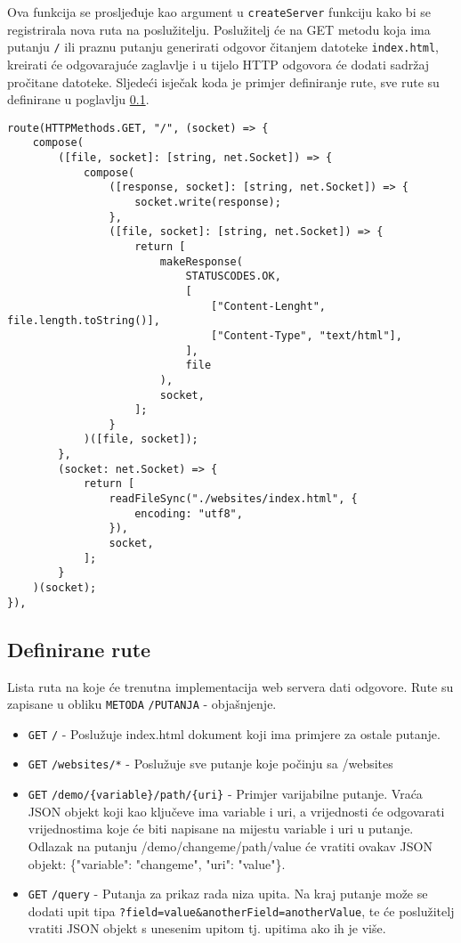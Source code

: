 \documentclass[]{foi} %
\begin{document}
Ova funkcija se prosljeđuje kao argument u \texttt{createServer} funkciju kako bi se
registrirala nova ruta na poslužitelju. Poslužitelj će na GET metodu koja ima putanju
\texttt{/} ili praznu putanju generirati odgovor čitanjem datoteke \texttt{index.html},
kreirati će odgovarajuće zaglavlje i u tijelo HTTP odgovora će dodati sadržaj pročitane
datoteke. Sljedeći isječak koda je primjer definiranje rute, sve rute su definirane u
poglavlju \ref{sec:rute}.
\begin{lstlisting}[caption={Primjer rute}, label=lst:primjer_rute]
route(HTTPMethods.GET, "/", (socket) => {
    compose(
        ([file, socket]: [string, net.Socket]) => {
            compose(
                ([response, socket]: [string, net.Socket]) => {
                    socket.write(response);
                },
                ([file, socket]: [string, net.Socket]) => {
                    return [
                        makeResponse(
                            STATUSCODES.OK,
                            [
                                ["Content-Lenght", file.length.toString()],
                                ["Content-Type", "text/html"],
                            ],
                            file
                        ),
                        socket,
                    ];
                }
            )([file, socket]);
        },
        (socket: net.Socket) => {
            return [
                readFileSync("./websites/index.html", {
                    encoding: "utf8",
                }),
                socket,
            ];
        }
    )(socket);
}),
\end{lstlisting}

\subsection{Definirane rute} \label{sec:rute}

Lista ruta na koje će trenutna implementacija web servera dati odgovore.
Rute su zapisane u obliku \texttt{METODA} \texttt{/PUTANJA} - objašnjenje.
\begin{itemize}
	\item \texttt{GET} \texttt{/} - Poslužuje index.html dokument koji ima primjere
	      za ostale putanje.
	\item \texttt{GET} \texttt{/websites/*} - Poslužuje sve putanje koje počinju sa /websites
	\item \texttt{GET} \texttt{/demo/\{variable\}/path/\{uri\}} - Primjer varijabilne putanje.
	      Vraća JSON objekt koji kao ključeve ima variable i uri, a vrijednosti će odgovarati
	      vrijednostima koje će biti napisane na mijestu variable i uri u putanje. Odlazak na
	      putanju /demo/changeme/path/value će vratiti ovakav JSON objekt: \{"variable": "changeme", "uri": "value"\}.
	\item \texttt{GET} \texttt{/query} - Putanja za prikaz rada niza upita. Na kraj putanje može
	      se dodati upit tipa \texttt{?field=value\&anotherField=anotherValue}, te će poslužitelj
	      vratiti JSON objekt s unesenim upitom tj. upitima ako ih je više.
\end{itemize}
\end{document}
